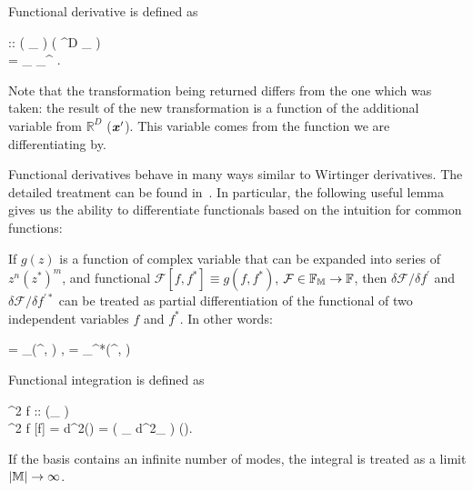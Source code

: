 \begin{definition}
\label{def:func-calculus:func-diff}
	Functional derivative is defined as
	\begin{eqn*}
		 ::
		\left(
			_{\restbasis} \rightarrow {}
		\right)
		\rightarrow
		\left(
			^D \rightarrow {}_{\restbasis} \rightarrow {}
		\right) \\
		= \sum_{\nvec \in \restbasis} \phi_{\nvec}^{\prime*}
			.
	\end{eqn*}
\end{definition}

Note that the transformation being returned differs from the one which was taken: the result of the new transformation is a function of the additional variable from $\mathbb{R}^D$ ($\boldsymbol{x}^\prime$).
This variable comes from the function we are differentiating by.

Functional derivatives behave in many ways similar to Wirtinger derivatives.
The detailed treatment can be found in~\cite{Dalton2011}.
In particular, the following useful lemma gives us the ability to differentiate functionals based on the intuition for common functions:

\begin{lemma}
	If $g(z)$ is a function of complex variable that can be expanded into series of $z^n (z^*)^m$, and functional $\mathcal{F}[f, f^*] \equiv g(f, f^*)$, $\mathcal{F} \in \mathbb{F}_{\mathbb{M}} \rightarrow \mathbb{F}$, then $\delta \mathcal{F} / \delta f^\prime$ and $\delta \mathcal{F} / \delta f^{\prime*}$ can be treated as partial differentiation of the functional of two independent variables $f$ and $f^*$.
	In other words:
	\begin{eqn*}
		\frac{\delta \mathcal{F}}{\delta f^\prime}
		= \delta_{\restbasis}(\xvec^\prime, \xvec)
			\frac{\partial g(f, f^*)}{\partial f},
		\quad
		\frac{\delta \mathcal{F}}{\delta f^{\prime*}}
		= \delta_{\restbasis}^*(\xvec^\prime, \xvec)
			\frac{\partial g(f, f^*)}{\partial f^*}
	\end{eqn*}
\end{lemma}

Functional integration is defined as

\begin{definition}
	\begin{eqn*}
		\int \delta^2 f :: (_{\restbasis} \rightarrow {}) \rightarrow \mathbb{C} \\
		\int \delta^2 f \mathcal{F}[f]
		= \int d^2\balpha {}(\balpha)
		= \left(
			\prod_{\nvec \in \restbasis} \int d^2\alpha_{\nvec}
		\right) (\balpha).
	\end{eqn*}
    If the basis contains an infinite number of modes, the integral is treated as a limit $|\mathbb{M}| \rightarrow \infty$.
\end{definition}

